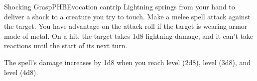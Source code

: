 \begin{spell}{Shocking Grasp}{PHB}{Evocation cantrip}
{
}
Lightning springs from your hand to deliver a shock to
a creature you try to touch. Make a melee spell attack
against the target. You have advantage on the attack roll
if the target is wearing armor made of metal. On a hit,
the target takes 1d8 lightning damage, and it can't take
reactions until the start of its next turn.

The spell's damage increases by 1d8 when you reach
 level (2d8),  level (3d8), and  level (4d8).
\end{spell}